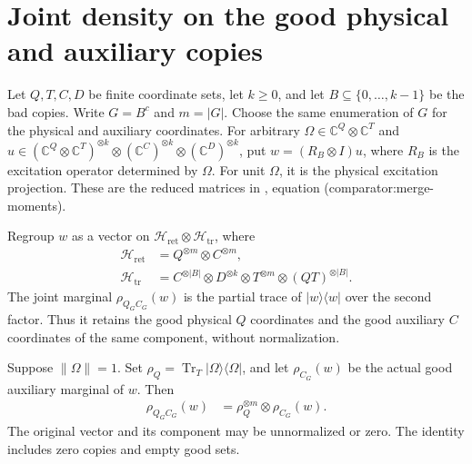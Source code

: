 \section{Joint density on the good physical and auxiliary copies}
\label{sec:replica_joint_density}

Let $Q,T,C,D$ be finite coordinate sets, let $k\geq0$, and let
$B\subseteq\{0,\ldots,k-1\}$ be the bad copies. Write $G=B^c$ and
$m=|G|$. Choose the same enumeration of $G$ for the physical and auxiliary
coordinates. For arbitrary $\Omega\in\mathbb C^Q\otimes\mathbb C^T$ and
$u\in(\mathbb C^Q\otimes\mathbb C^T)^{\otimes k}
\otimes(\mathbb C^C)^{\otimes k}\otimes(\mathbb C^D)^{\otimes k}$,
put $w=(R_B\otimes I)u$, where $R_B$ is the excitation operator determined by $\Omega$.
For unit $\Omega$, it is the physical excitation projection.
These are the reduced matrices in \cite[Section~7]{OpenAI2026AreaLaw},
equation (comparator:merge-moments).

\begin{definition}
\label{def:replica_good_regional_auxiliary_marginal}
\leanok
{}
Regroup $w$ as a vector on $\mathcal H_{\mathrm{ret}}\otimes
\mathcal H_{\mathrm{tr}}$, where
\begin{align}
 \mathcal H_{\mathrm{ret}}&=Q^{\otimes m}\otimes C^{\otimes m},\\
 \mathcal H_{\mathrm{tr}}&=C^{\otimes|B|}\otimes D^{\otimes k}
   \otimes T^{\otimes m}\otimes(QT)^{\otimes|B|}.
\end{align}
The joint marginal $\rho_{Q_GC_G}(w)$ is the partial trace of
$|w\rangle\langle w|$ over the second factor. Thus it retains the good
physical $Q$ coordinates and the good auxiliary $C$ coordinates of the
same component, without normalization.
\end{definition}

\begin{theorem}
\label{thm:replica_good_regional_auxiliary_density}
\leanok
{}
Suppose $\|\Omega\|=1$. Set
$\rho_Q=\operatorname{Tr}_T|\Omega\rangle\langle\Omega|$, and let
$\rho_{C_G}(w)$ be the actual good auxiliary marginal of $w$. Then
\begin{align}
 \rho_{Q_GC_G}(w)&=\rho_Q^{\otimes m}\otimes\rho_{C_G}(w).
 \label{eq:replica_joint_product}
\end{align}
The original vector and its component may be unnormalized or zero.
The identity includes zero copies and empty good sets.
\end{theorem}

